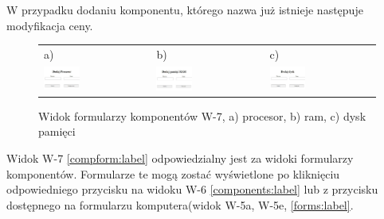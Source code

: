 W przypadku dodaniu komponentu, którego nazwa już istnieje następuje modyfikacja ceny.


\begin{figure}[htb]
  \centering
	\begin{tabular}{@{}lll@{}}
	a) & b) & c) \\
  \includegraphics[width=0.35\textwidth]{rys05/view/addProc.pdf} & 
	\includegraphics[width=0.35\textwidth]{rys05/view/addRam.pdf} &
	\includegraphics[width=0.35\textwidth]{rys05/view/addStorage.pdf}
	\end{tabular}
  \caption{Widok formularzy komponentów W-7, a) procesor, b) ram, c) dysk pamięci}
  \label{compforms:label}
\end{figure}

Widok W-7 \ref{compform:label} odpowiedzialny jest za widoki formularzy komponentów. Formularze te mogą zostać wyświetlone po kliknięciu odpowiedniego przycisku na widoku W-6 \ref{components:label} lub z przycisku dostępnego na formularzu komputera(widok W-5a, W-5e, \ref{forms:label}.



